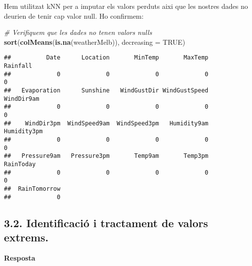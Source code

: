 \documentclass[
]{article}
\newenvironment{Shaded}{\begin{snugshade}}{\end{snugshade}}
\newcommand{\CommentTok}[1]{\textcolor[rgb]{0.56,0.35,0.01}{\textit{#1}}}
\newcommand{\DataTypeTok}[1]{\textcolor[rgb]{0.13,0.29,0.53}{#1}}
\newcommand{\DecValTok}[1]{\textcolor[rgb]{0.00,0.00,0.81}{#1}}
\newcommand{\KeywordTok}[1]{\textcolor[rgb]{0.13,0.29,0.53}{\textbf{#1}}}
\newcommand{\NormalTok}[1]{#1}
\newcommand{\OperatorTok}[1]{\textcolor[rgb]{0.81,0.36,0.00}{\textbf{#1}}}
\newcommand{\OtherTok}[1]{\textcolor[rgb]{0.56,0.35,0.01}{#1}}
\newcommand{\StringTok}[1]{\textcolor[rgb]{0.31,0.60,0.02}{#1}}
\begin{document}
Hem utilitzat kNN per a imputar els valors perduts aixi que les nostres
dades no deurien de tenir cap valor null. Ho confirmem:

\begin{Shaded}
\begin{Highlighting}[]
\CommentTok{# Verifiquem que les dades no tenen valors nulls}
\KeywordTok{sort}\NormalTok{(}\KeywordTok{colMeans}\NormalTok{(}\KeywordTok{is.na}\NormalTok{(weatherMelb)), }\DataTypeTok{decreasing =} \OtherTok{TRUE}\NormalTok{)}
\end{Highlighting}
\end{Shaded}

\begin{verbatim}
##          Date      Location       MinTemp       MaxTemp      Rainfall 
##             0             0             0             0             0 
##   Evaporation      Sunshine   WindGustDir WindGustSpeed    WindDir9am 
##             0             0             0             0             0 
##    WindDir3pm  WindSpeed9am  WindSpeed3pm   Humidity9am   Humidity3pm 
##             0             0             0             0             0 
##   Pressure9am   Pressure3pm       Temp9am       Temp3pm     RainToday 
##             0             0             0             0             0 
##  RainTomorrow 
##             0
\end{verbatim}

\hypertarget{identificaciuxf3-i-tractament-de-valors-extrems.}{%
\subsection{3.2. Identificació i tractament de valors
extrems.}\label{identificaciuxf3-i-tractament-de-valors-extrems.}}

\textbf{Resposta}

\begin{Shaded}
\end{Shaded}
\end{document}
